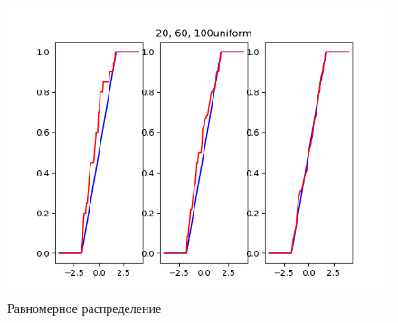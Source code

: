 \documentclass[a4]{article}
\begin{document}
\begin{center}
\begin{figure}[h!]
				\includegraphics[width=\textwidth]{uniformemp.png}
				\caption[Равномерное распределение]{Равномерное распределение}
			\end{figure}
			\newpage
			
		\end{center}
\end{document}
